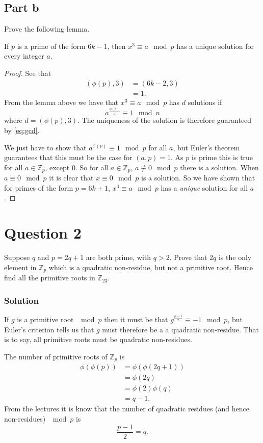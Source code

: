 \documentclass{unswmaths}
\begin{document}
\subsection*{Part b}
Prove the following lemma.
\begin{unswlem}
If $ p $ is a prime of the form $ 6k - 1 $, then $ x^3 \equiv a \mod p $ 
has a unique solution for every integer $ a $.
\end{unswlem}
\begin{proof}
See that 
\begin{align}
	\label{eq:gcd}
	(\phi(p), 3) 	&= (6k - 2, 3) \\
			&= 1. \nonumber
\end{align}
From the lemma above we have that $ x^3 \equiv a \mod p $ has $ d $ solutions if
$$ a^\frac{\phi(p)}{d} \equiv 1 \mod n $$ where $ d =  (\phi(p), 3 ) $.
The uniqueness of the solution is therefore guaranteed by \eqref{eq:gcd}.

We just have to show that $ a^{\phi(p)} \equiv 1 \mod p $ for all $ a $, 
but Euler's theorem guarantees that this must be the case for $ (a, p) = 1 $. 
As $ p $ is prime this is true for all $ a \in \mathbb{Z}_p $, except $ 0 $.
So for all $ a \in \mathbb{Z}_p $, $ a \not\equiv 0 \mod p $ there is a solution.
When $ a \equiv 0 \mod p $ it is clear that $ x \equiv 0 \mod p $ is a solution.  
So we have shown that for primes of the form $ p = 6k + 1 $,
$ x^3 \equiv a \mod p $ has a \emph{unique} solution for all $ a $.
\end{proof}

\section*{Question 2}
Suppose $ q $ and $ p = 2q + 1 $ are both prime, with $ q > 2 $. Prove that $ 2q $ is the 
only element in $ \mathbb{Z}_p $ which is a quadratic non-residue, 
but not a primitive root. Hence find all the primitive roots in $ \mathbb{Z}_{23} $. 
\subsubsection*{Solution}
If $ g $ is a primitive root $ \mod p $ then it must be that 
$ g^{\frac{p-1}{2}} \equiv -1 \mod p $, but Euler's criterion tells us that $ g $ must
therefore be a a quadratic non-residue. That is to say, all primitive roots must be
quadratic non-residues. 

The number of primitive roots of $ \mathbb{Z}_p $ is 
\begin{align}
\phi(\phi(p)) 	&= \phi(\phi(2q+1)) \nonumber \\
		&= \phi(2q) \nonumber \\
		&= \phi(2)\phi(q) \nonumber \\
		&= q - 1. \label{eq:num_pr}
\end{align}
From the lectures it is know that the number of quadratic residues (and hence
non-residues) $ \mod p $ is 
\begin{equation}
\label{eq:num_qr}
\frac{p - 1}{2} = q.
\end{equation}
\end{document}
